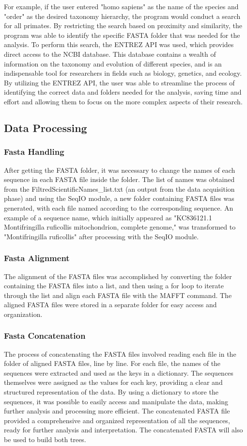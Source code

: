 \documentclass[12pt]{article}
\begin{document}
For example, if the user entered "homo sapiens" as the name of the species and "order" as the desired taxonomy hierarchy, the program would conduct a search for all primates. By restricting the search based on proximity and similarity, the program was able to identify the specific FASTA folder that was needed for the analysis.\newline
To perform this search, the ENTREZ API was used, which provides direct access to the NCBI database. This database contains a wealth of information on the taxonomy and evolution of different species, and is an indispensable tool for researchers in fields such as biology, genetics, and ecology. By utilizing the ENTREZ API, the user was able to streamline the process of identifying the correct data and folders needed for the analysis, saving time and effort and allowing them to focus on the more complex aspects of their research.
\subsection{Data Processing}
\subsubsection{Fasta Handling}
After getting the FASTA folder, it was necessary to change the names of each sequence in each FASTA file inside the folder. The list of names was obtained from the FiltredScientificNames\_list.txt (an output from the data acquisition phase) and using the SeqIO module, a new folder containing FASTA files was generated, with each file named according to the corresponding sequence. An example of a sequence name, which initially appeared as "\>KC836121.1 Montifringilla ruficollis mitochondrion, complete genome," was transformed to "Montifringilla ruficollis" after processing with the SeqIO module.
\subsubsection{Fasta Alignment}
The alignment of the FASTA files was accomplished by converting the folder containing the FASTA files into a list, and then using a for loop to iterate through the list and align each FASTA file with the MAFFT command. The aligned FASTA files were stored in a separate folder for easy access and organization.
\subsubsection{Fasta Concatenation}
The process of concatenating the FASTA files involved reading each file in the folder of aligned FASTA files, line by line. For each file, the names of the sequences were extracted and used as the keys in a dictionary. The sequences themselves were assigned as the values for each key, providing a clear and structured representation of the data.\newline
By using a dictionary to store the sequences, it was possible to easily access and manipulate the data, making further analysis and processing more efficient. The concatenated FASTA file provided a comprehensive and organized representation of all the sequences, ready for further analysis and interpretation. The concatenated FASTA will also be used to build both trees.
\end{document}
